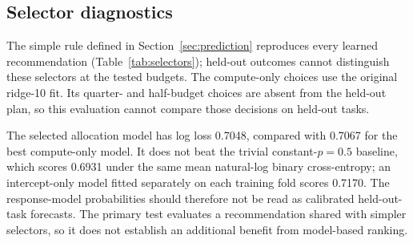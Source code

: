 \documentclass{article}
\begin{document}
\begin{table}[htbp]
\centering\small
\caption{Discovery-based selector choices.
The learned choices and comparisons were fixed before held-out evaluation; additional
selector baselines were documented after collection began.
The empirical selector uses the measured grid; other selectors use the declared
candidate set. The simple rule exactly matches the learned choices. The selected
rate ratio is the learned recommendation's nominal arithmetic rate
divided by the native rate. Prespecified comparators
and predicted gaps appear in Table~\ref{tab:confirmation-predictions};
the half-native row is primary.
}
\label{tab:selectors}

\end{table}

\begin{table}[htbp]
\centering\small
\caption{All prespecified denoising comparisons: selected minus comparator,
holding $h$ fixed within each row. Predicted and observed gaps and intervals are
percentage points. The half-native row is primary; secondary intervals are
descriptive, task-conditional, and unadjusted.}
\label{tab:confirmation-predictions}

\end{table}

\subsection{Selector diagnostics}

The simple rule defined in Section~\ref{sec:prediction} reproduces every learned
recommendation (Table~\ref{tab:selectors});
held-out outcomes cannot distinguish these selectors at the tested budgets.
The compute-only choices use the original ridge-10 fit. Its quarter- and
half-budget choices are absent from the held-out plan, so this evaluation
cannot compare those decisions on held-out tasks.

The selected allocation model has log loss 0.7048, compared with 0.7067 for the
best compute-only model. It does not beat the trivial constant-$p=0.5$ baseline,
which scores 0.6931 under the same mean natural-log binary cross-entropy; an
intercept-only model fitted separately on
each training fold scores 0.7170. The response-model probabilities should
therefore not be read as calibrated held-out-task forecasts. The primary test
evaluates a recommendation shared with simpler selectors, so it does not
establish an additional benefit from model-based ranking.
\end{document}
